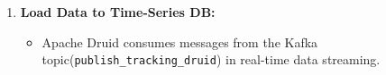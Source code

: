 \documentclass{article}
\begin{document}
\begin{enumerate}
    \item \textbf{Load Data to Time-Series DB:}
    \begin{itemize}
        \item Apache Druid consumes messages from the Kafka topic(\texttt{publish\_tracking\_druid}) in real-time data streaming.
    \end{itemize}
\end{enumerate}
\end{document}
